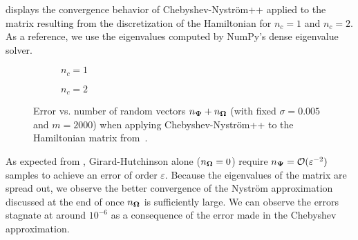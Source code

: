  displays the convergence behavior of Chebyshev-Nyström++ applied to the matrix resulting from the discretization of the Hamiltonian for $n_c = 1$ and $n_c = 2$. As a reference, we use the eigenvalues computed by NumPy's dense eigenvalue solver.
\begin{figure}[ht]
    \centering
    \begin{subfigure}[b]{0.495\textwidth}
        
        \caption{$n_c = 1$}
        \label{fig:convergence-1}
    \end{subfigure}
    \begin{subfigure}[b]{0.495\textwidth}
        
        \caption{$n_c = 2$}
        \label{fig:convergence-2}
    \end{subfigure}
    \caption{Error vs. number of random vectors $n_{\boldsymbol{\Psi}} + n_{\boldsymbol{\Omega}}$ (with fixed $\sigma=0.005$ and $m=2000$) when applying  Chebyshev-Nyström++ to the Hamiltonian matrix from~.}
    \label{fig:convergence}
\end{figure}%
%    
As expected from , Girard-Hutchinson alone ($n_{\boldsymbol{\Omega}} = 0$) require $n_{\boldsymbol{\Psi}} = \mathcal{O}(\varepsilon^{-2})$ samples to achieve an error of order $\varepsilon$. Because the eigenvalues of the matrix are spread out, we observe the better convergence of the Nyström approximation discussed at the end of  once $n_{\boldsymbol{\Omega}}$ is sufficiently large. We can observe the errors stagnate at around $10^{-6}$ as a consequence of the error made in the Chebyshev approximation.

%    

